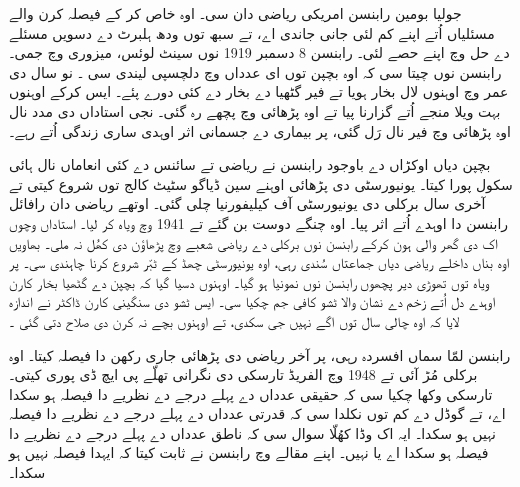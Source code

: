 \documentclass[../../../include/open-logic-section]{subfiles}
\begin{document}



جولیا بومین رابنسن امریکی ریاضی دان سی۔ اوہ خاص کر کے فیصلہ کرن والے مسئلیاں اُتے اپنے کم لئی جانی جاندی اے، تے سبھ توں ودھ ہلبرٹ دے دسویں مسئلے دے حل وچ اپنے حصے لئی۔ رابنسن 8 دسمبر 1919 نوں سینٹ لوئس، میزوری وچ جمی۔ رابنسن نوں چیتا سی کہ اوہ بچپن توں ای عدداں وچ دلچسپی لیندی سی \citep[4]{Reid1986}۔ نو سال دی عمر وچ اوہنوں لال بخار ہویا تے فیر گٹھیا دے بخار دے کئی دورے پئے۔ ایس کرکے اوہنوں بہت ویلا منجے اُتے گزارنا پیا تے اوہ پڑھائی وچ پچھے رہ گئی۔ نجی استاداں دی مدد نال اوہ پڑھائی وچ فیر نال رَل گئی، پر بیماری دے جسمانی اثر اوہدی ساری زندگی اُتے رہے۔

بچپن دیاں اوکڑاں دے باوجود رابنسن نے ریاضی تے سائنس دے کئی انعاماں نال ہائی سکول پورا کیتا۔ یونیورسٹی دی پڑھائی اوہنے سین ڈیاگو سٹیٹ کالج توں شروع کیتی تے آخری سال برکلی دی یونیورسٹی آف کیلیفورنیا چلی گئی۔ اوتھے ریاضی دان رافائل رابنسن دا اوہدے اُتے اثر پیا۔ اوہ چنگے دوست بن گئے تے 1941 وچ ویاہ کر لیا۔ استاداں وچوں اک دی گھر والی ہون کرکے رابنسن نوں برکلی دے ریاضی شعبے وچ پڑھاؤن دی کھُل نہ ملی۔ بھاویں اوہ بناں داخلے ریاضی دیاں جماعتاں سُندی رہی، اوہ یونیورسٹی چھڈ کے ٹبّر شروع کرنا چاہندی سی۔ پر ویاہ توں تھوڑی دیر پچھوں رابنسن نوں نمونیا ہو گیا۔ اوہنوں دسیا گیا کہ بچپن دے گٹھیا بخار کارن اوہدے دل اُتے زخم دے نشان والا ٹشو کافی جم چکیا سی۔ ایس ٹشو دی سنگینی کارن ڈاکٹر نے اندازہ لایا کہ اوہ چالی سال توں اگے نہیں جی سکدی، تے اوہنوں بچے نہ کرن دی صلاح دتی گئی \citep[13]{Reid1986}۔

رابنسن لمّا سماں افسردہ رہی، پر آخر ریاضی دی پڑھائی جاری رکھن دا فیصلہ کیتا۔ اوہ برکلی مُڑ آئی تے 1948 وچ الفریڈ تارسکی دی نگرانی تھلّے پی ایچ ڈی پوری کیتی۔ تارسکی وکھا چکیا سی کہ حقیقی عدداں دے پہلے درجے دے نظریے دا فیصلہ ہو سکدا اے، تے گوڈل دے کم توں نکلدا سی کہ قدرتی عدداں دے پہلے درجے دے نظریے دا فیصلہ نہیں ہو سکدا۔ ایہ اک وڈا کھُلّا سوال سی کہ ناطق عدداں دے پہلے درجے دے نظریے دا فیصلہ ہو سکدا اے یا نہیں۔ اپنے مقالے \citeyearpar{Robinson1949} وچ رابنسن نے ثابت کیتا کہ ایہدا فیصلہ نہیں ہو سکدا۔
\end{document}
